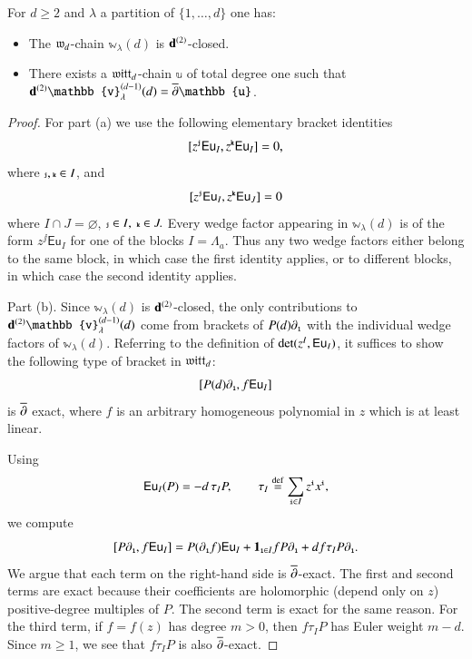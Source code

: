 \documentclass[main.tex]{subfiles}
\begin{document}
\begin{lemma}\label{lem:wlambda}
  For $d\geq2$ and $\lambda$ a partition of $\{1,\ldots,d\}$ one has:
    \begin{itemize}
      \item[(a)] The $\mathfrak{w}_d$-chain $\mathbb{w}_{\lambda}(d)$ is $\mathbf d^{(2)}$-closed.
      \item[(b)] There exists a $\mathfrak{witt}_d$-chain $\mathbb{u}$ of total degree one such that $\bd^{(2)} \mathbb{v}
        ^{(d-1)}_{\lambda}(d) = \dbar
      \mathbb{u}$.
    \end{itemize}
\end{lemma}
\begin{proof}
  For part (a) we use the following elementary bracket identities
  \[
    [z^{\textbf{\texttt{\tiny{j}}}}\mathsf{Eu}_I,z^{\textbf{\texttt{\tiny{k}}}}\mathsf{Eu}_I]=0 ,
  \]
  where $\textbf{\texttt{\tiny{j}}},\textbf{\texttt{\tiny{k}}} \in I$, and
  \[
    [z^{\textbf{\texttt{\tiny{j}}}}\mathsf{Eu}_I,z^{\textbf{\texttt{\tiny{k}}}}\mathsf{Eu}_J]=0
  \]
  where $I\cap J=\varnothing$, $\textbf{\texttt{\tiny{j}}}\in I,\ \textbf{\texttt{\tiny{k}}}\in J.$
  Every wedge factor appearing in $\mathbb{w}_\lambda(d)$ is of the form $z^{\jj}\mathsf{Eu}_I$ for one of the blocks $I=\Lambda_a$. 
  Thus any two wedge factors either belong to the same block, in which case the first identity applies, or to different blocks, in which case the second identity applies.

  Part (b). 
  Since $\mathbb{w}_\lambda (d)$ is $\mathbf d^{(2)}$-closed, the only contributions to $\bd^{(2)}\mathbb{v}_\lambda^{(d-1)} (d)
  $ come from brackets of $P(d) \partial_{{\textbf{\texttt{\tiny{1}}}}}$ with the individual wedge factors of $\mathbb{w}_\lambda (d)$.
  Referring to the definition of $\operatorname{det}(z^I, \mathsf{Eu}_I)$, it suffices to show the following type
  of bracket in $\mathfrak{witt}_d$:
  \begin{equation}\label{}
    [P(d) \partial_{{\textbf{\texttt{\tiny{1}}}}} , f \mathsf{Eu}_I] 
  \end{equation}
  is $\overline{\partial}$ exact, where $f$ is an arbitrary homogeneous polynomial in $z$ which is at least linear.
  
  Using
  \[
    \mathsf{Eu}_I(P)=-d\,\tau_I P,
    \qquad
    \tau_I\overset{\rm def}{=} \sum_{\textbf{\texttt{\tiny{i}}}\in I}z^{\textbf{\texttt{\tiny{i}}}} x^{\textbf{\texttt{\tiny{i}}}},
  \]
  we compute
  \begin{equation}\label{eq:P-Eu-bracket-expanded}
    [P\partial_{\textbf{\texttt{\tiny{1}}}},f\mathsf{Eu}_I]
    =
    P(\partial_{\textbf{\texttt{\tiny{1}}}} f)\mathsf{Eu}_I
    +
    \mathbf 1_{{\textbf{\texttt{\tiny{1}}}}\in I} fP\partial_{\textbf{\texttt{\tiny{1}}}}
    +
    d f\tau_I P\partial_{\textbf{\texttt{\tiny{1}}}} .
  \end{equation}
  We argue that each term on the right-hand side is $\overline{\partial}$-exact. 
  The first and second terms are exact because their coefficients are holomorphic (depend only on $z$) positive-degree
multiples of $P$. The second term is exact for the same reason. 
For the third term, if $f=f(z)$ has degree $m>0$, then $f\tau_I P$ has Euler weight
$m-d$. 
Since $m \geq 1$, we see that $f\tau_I P$ is also $\overline{\partial}$-exact.
\end{proof}
\end{document}
